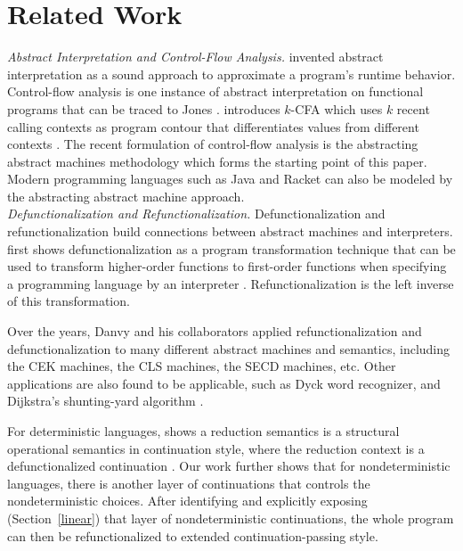 \documentclass[acmsmall, review]{acmart}\settopmatter{}
\begin{document}
\section{Related Work}\label{sec:related}

\textit{Abstract Interpretation and Control-Flow Analysis.}
\citeauthor{cousot1977abstract} invented abstract interpretation as a sound approach
to approximate a program's runtime behavior\cite{cousot1977abstract}.
Control-flow analysis is one instance of abstract interpretation on functional programs
that can be traced to Jones \cite{jones1981flow}. \citeauthor{Shivers:1988:CFA:53990.54007} 
introduces $k$-CFA which uses $k$ recent calling contexts as program contour that 
differentiates values from different contexts \cite{Shivers:1988:CFA:53990.54007, 
Shivers:1991:SSC:115865.115884}.
The recent formulation of control-flow analysis is the abstracting abstract machines
methodology \cite{van2012systematic, van2010abstracting} which forms the starting point
of this paper.
Modern programming languages such as Java\cite{might2010resolving} and Racket 
\cite{Tobin-Hochstadt:2012:HSE:2384616.2384655}
can also be modeled by the abstracting abstract machine approach. \\

\textit{Defunctionalization and Refunctionalization.}
Defunctionalization and refunctionalization build connections between abstract
machines and interpreters.
\citeauthor{Reynolds:72} first shows defunctionalization as a program transformation 
technique that can be used to transform higher-order functions to first-order functions
when specifying a programming language by an interpreter \cite{Reynolds:72, Reynolds:HOSC98-revisited}.
Refunctionalization is the left inverse of this transformation.

Over the years, Danvy and his collaborators applied refunctionalization and defunctionalization 
to many different abstract machines and semantics, including the CEK machines, the CLS machines,
the SECD machines, etc.
\cite{Ager:2003:FCE:888251.888254, Danvy:2001:DW:773184.773202, danvy2004refocusing, 
Danvy:2008:DIP:1411204.1411206, AGER2004223, ager2005functional, Danvy:2006:RW:2171265.2171268,
 danvy2009towards, biernacka2009towards}
Other applications are also found to be applicable, such as Dyck word recognizer, and 
Dijkstra's shunting-yard algorithm \cite{Danvy:2006:RW:2171265.2171268}.

For deterministic languages, \citeauthor{Danvy:2008:DIP:1411204.1411206} shows
a reduction semantics is a structural operational semantics in continuation style,
where the reduction context is a defunctionalized continuation \cite{Danvy:2008:DIP:1411204.1411206}.
Our work further shows that for nondeterministic languages, there is another layer of continuations
that controls the nondeterministic choices. After identifying and explicitly exposing 
(Section~\ref{linear}) that layer of nondeterministic continuations, the whole program can 
then be refunctionalized to extended continuation-passing style.
\end{document}
